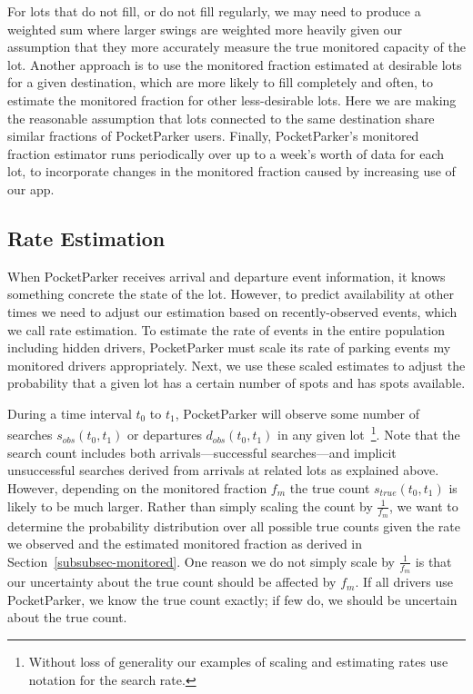 For lots that do not fill, or do not fill regularly, we may need to produce a
weighted sum where larger swings are weighted more heavily given our
assumption that they more accurately measure the true monitored capacity of
the lot. Another approach is to use the monitored fraction estimated at
desirable lots for a given destination, which are more likely to fill
completely and often, to estimate the monitored fraction for other
less-desirable lots. Here we are making the reasonable assumption that lots
connected to the same destination share similar fractions of PocketParker
users. Finally, PocketParker's monitored fraction estimator runs periodically
over up to a week's worth of data for each lot, to incorporate changes in the
monitored fraction caused by increasing use of our app.

\subsection{Rate Estimation}
\label{subsec-rates}

When PocketParker receives arrival and departure event information, it knows
something concrete the state of the lot. However, to predict availability at
other times we need to adjust our estimation based on recently-observed
events, which we call rate estimation. To estimate the rate of events in the
entire population including hidden drivers, PocketParker must scale its rate
of parking events my monitored drivers appropriately. Next, we use these
scaled estimates to adjust the probability that a given lot has a certain
number of spots and has spots available.

During a time interval $t_0$ to $t_1$, PocketParker will observe some number
of searches $s_{obs}(t_0, t_1)$ or departures $d_{obs}(t_0, t_1)$ in any
given lot~\footnote{Without loss of generality our examples of scaling and
estimating rates use notation for the search rate.}. Note that the search
count includes both arrivals---successful searches---and implicit
unsuccessful searches derived from arrivals at related lots as explained
above. However, depending on the monitored fraction $f_m$ the true count
$s_{true}(t_0, t_1)$ is likely to be much larger. Rather than simply scaling
the count by $\frac{1}{f_m}$, we want to determine the probability
distribution over all possible true counts given the rate we observed and the
estimated monitored fraction as derived in Section~\ref{subsubsec-monitored}.
One reason we do not simply scale by $\frac{1}{f_m}$ is that our uncertainty
about the true count should be affected by $f_m$. If all drivers use
PocketParker, we know the true count exactly; if few do, we should be
uncertain about the true count.

